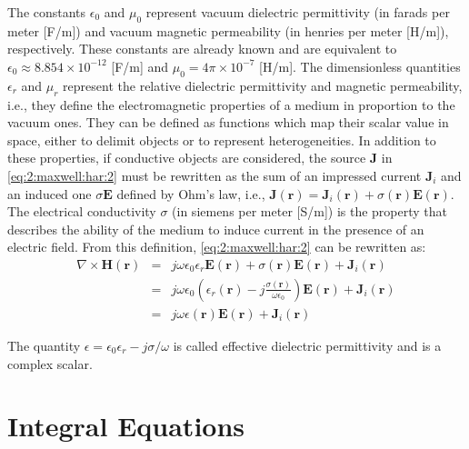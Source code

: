 		The constants $\epsilon_0$ and $\mu_0$ represent vacuum dielectric permittivity (in farads per meter [F/m]) and vacuum magnetic permeability (in henries per meter [H/m]), respectively. These constants are already known and are equivalent to $\epsilon_0\approx 8.854\times10^{-12}$ [F/m] and $\mu_0 = 4\pi\times10^{-7}$ [H/m]. The dimensionless quantities $\epsilon_r$ and $\mu_r$ represent the relative dielectric permittivity and magnetic permeability, i.e., they define the electromagnetic properties of a medium in proportion to the vacuum ones. They can be defined as functions which map their scalar value in space, either to delimit objects or to represent heterogeneities. In addition to these properties, if conductive objects are considered, the source $\mathbf{J}$ in \eqref{eq:2:maxwell:har:2} must be rewritten as the sum of an impressed current $\mathbf{J}_i $ and an induced one $\sigma\mathbf{E}$ defined by Ohm's law, i.e., $\mathbf{J}(\mathbf {r}) = \mathbf{J}_i (\mathbf{r}) + \sigma(\mathbf{r})\mathbf{E}(\mathbf{r})$. The electrical conductivity $\sigma$ (in siemens per meter [S/m]) is the property that describes the ability of the medium to induce current in the presence of an electric field. From this definition, \eqref{eq:2:maxwell:har:2} can be rewritten as:
		\begin{eqnarray}
			\nabla\times\mathbf{H}(\mathbf{r}) &=&  j\omega\epsilon_0\epsilon_r\mathbf{E}(\mathbf{r}) + \sigma(\mathbf{r})\mathbf{E}(\mathbf{r})+ \mathbf{J}_i(\mathbf{r}) \label{eq:2:complexmedia:1} \\
			 &=&  j\omega\epsilon_0\left(\epsilon_r(\mathbf{r}) -j\frac{\sigma(\mathbf{r})}{\omega\epsilon_0}\right)\mathbf{E}(\mathbf{r}) +  \mathbf{J}_i(\mathbf{r}) \label{eq:2:complexmedia:2} \\
			&=&  j\omega\epsilon(\mathbf{r})\mathbf{E}(\mathbf{r}) +  \mathbf{J}_i(\mathbf{r}) \label{eq:2:complexmedia:3}
		\end{eqnarray}
	
		The quantity $\epsilon = \epsilon_0\epsilon_r - j\sigma/\omega$ is called effective dielectric permittivity and is a complex scalar.
	
	\section{Integral Equations}\label{chap:problemstatement:integral}
	
